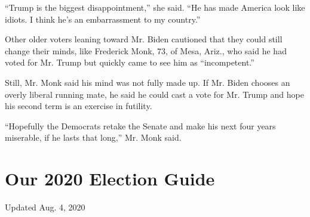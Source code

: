 ``Trump is the biggest disappointment,'' she said. ``He has made America
look like idiots. I think he's an embarrassment to my country.''

Other older voters leaning toward Mr. Biden cautioned that they could
still change their minds, like Frederick Monk, 73, of Mesa, Ariz., who
said he had voted for Mr. Trump but quickly came to see him as
``incompetent.''

Still, Mr. Monk said his mind was not fully made up. If Mr. Biden
chooses an overly liberal running mate, he said he could cast a vote for
Mr. Trump and hope his second term is an exercise in futility.

``Hopefully the Democrats retake the Senate and make his next four years
miserable, if he lasts that long,'' Mr. Monk said.

\hypertarget{our-2020-election-guide}{%
\section{Our 2020 Election Guide}\label{our-2020-election-guide}}

Updated Aug. 4, 2020

